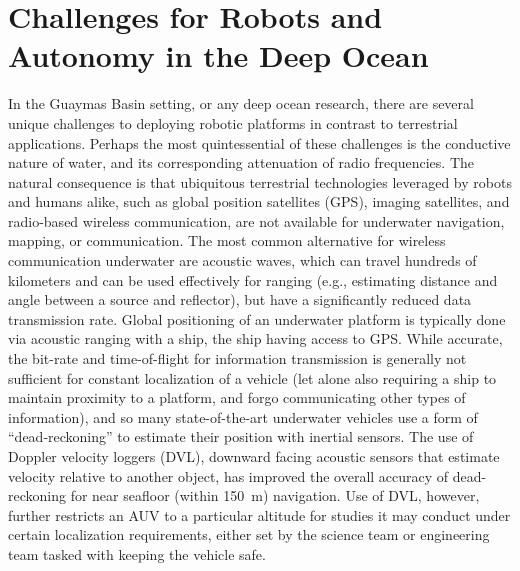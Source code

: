 \section{Challenges for Robots and Autonomy in the Deep Ocean}
\label{sec:ops_challenges}
In the Guaymas Basin setting, or any deep ocean research, there are several unique challenges to deploying robotic platforms in contrast to terrestrial applications. Perhaps the most quintessential of these challenges is the conductive nature of water, and its corresponding attenuation of radio frequencies\autocite{qureshi2016rf}. The natural consequence is that ubiquitous terrestrial technologies leveraged by robots and humans alike, such as global position satellites (GPS), imaging satellites, and radio-based wireless communication, are not available for underwater navigation, mapping, or communication. The most common alternative for wireless communication underwater are acoustic waves, which can travel hundreds of kilometers and can be used effectively for ranging (e.g., estimating distance and angle between a source and reflector), but have a significantly reduced data transmission rate. Global positioning of an underwater platform is typically done via acoustic ranging with a ship, the ship having access to GPS. While accurate, the bit-rate and time-of-flight for information transmission is generally not sufficient for constant localization of a vehicle (let alone also requiring a ship to maintain proximity to a platform, and forgo communicating other types of information), and so many state-of-the-art underwater vehicles use a form of ``dead-reckoning'' to estimate their position with inertial sensors. The use of Doppler velocity loggers (DVL), downward facing acoustic sensors that estimate velocity relative to another object, has improved the overall accuracy of dead-reckoning for near seafloor (within \SI{150}{\meter}) navigation. Use of DVL, however, further restricts an AUV to a particular altitude for studies it may conduct under certain localization requirements, either set by the science team or engineering team tasked with keeping the vehicle safe.

